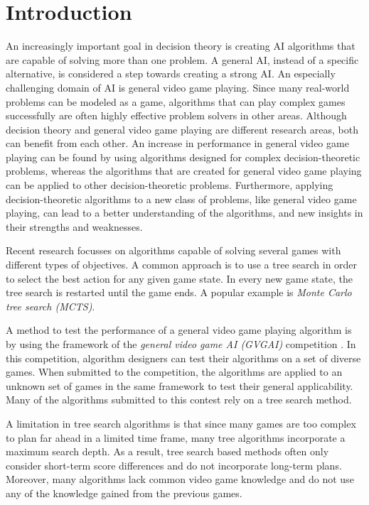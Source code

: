 \section{Introduction}
\label{sec:introduction}

An increasingly important goal in decision theory is creating AI algorithms that
are capable of solving more than one problem. A general AI, instead of a
specific alternative, is considered a step towards creating a strong AI.  An
especially challenging domain of AI is general video game playing.  Since many
real-world problems can be modeled as a game, algorithms that can play complex
games successfully are often highly effective problem solvers in other areas.
Although decision theory and general video game playing are different research
areas, both can benefit from each other.  An increase in performance in general
video game playing can be found by using algorithms designed for complex
decision-theoretic problems, whereas the algorithms that are created for general
video game playing can be applied to other decision-theoretic problems.
Furthermore, applying decision-theoretic algorithms to a new class of problems,
like general video game playing, can lead to a better understanding of the
algorithms, and new insights in their strengths and weaknesses. 

Recent research focusses on algorithms capable of solving several games with
different types of objectives. A common approach is to use a tree search in
order to select the best action for any given game state. In every new game
state, the tree search is restarted until the game ends.  A popular example is
\emph{Monte Carlo tree search (MCTS)}.

A method to test the performance of a general video game playing algorithm is
by using the framework of the \emph{general video game AI (GVGAI)} competition
\cite{perez2014}. In this competition, algorithm designers can test their
algorithms on a set of diverse games. When submitted to the competition, the
algorithms are applied to an unknown set of games in the same framework to test
their general applicability. Many of the algorithms submitted to this contest
rely on a tree search method.

A limitation in tree search algorithms is that since many games are too complex
to plan far ahead in a limited time frame, many tree algorithms incorporate a
maximum search depth. As a result, tree search based methods often only
consider short-term score differences and do not incorporate long-term
plans. Moreover, many algorithms lack common video game knowledge and do not
use any of the knowledge gained from the previous games.

